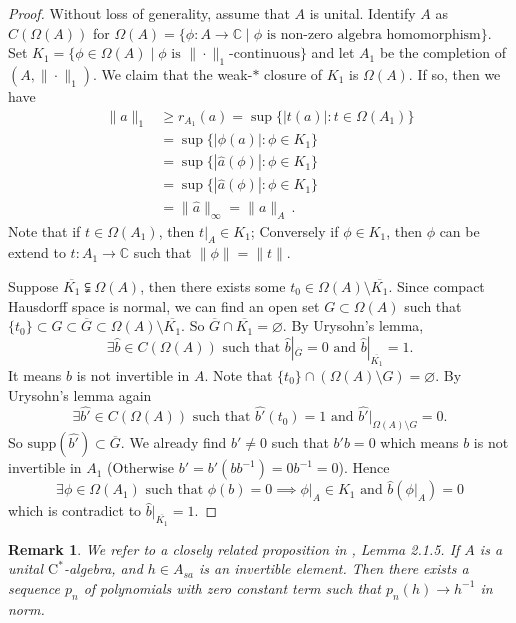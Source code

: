 \documentclass{article}
\newtheorem{remark}{Remark}[section]
\begin{document}
\begin{proof}
Without loss of generality, assume that $A$ is unital. Identify $A$ as $C(\Omega(A))$ for $\Omega(A) = \{ \phi : A \to \mathbb{C} \mid \phi \text{ is non-zero algebra homomorphism}\}$. Set $K_1 = \{ \phi \in \Omega(A) \mid \phi \text{ is } \| \cdot \|_1 \text{-continuous}\}$ and let $A_1$ be the completion of $(A,\| \cdot \|_1)$. We claim that the weak-$*$ closure of $K_1$ is $\Omega(A)$.
If so, then we have
\begin{align*}
\| a \|_1 & \geq r_{A_1}(a) = \sup \{ |t(a)| : t \in \Omega(A_1)\} \\
& = \sup \{ |\phi (a)| : \phi \in K_1 \} \\
& = \sup \{ |\hat{a}(\phi)| : \phi \in K_1\} \\
& = \sup \{ |\hat{a} (\phi)| : \phi \in K_1\} \\
& = \| \hat{a} \|_{\infty} = \| a\|_A \,.
\end{align*}
Note that if $t \in \Omega(A_1)$, then $t|_A \in K_1$; Conversely if $\phi \in K_1$, then $\phi$ can be extend to $t : A_1 \to \mathbb{C}$ such that $\|\phi\| = \| t\|$.

Suppose $\overline{K_1} \subsetneqq \Omega(A)$, then there exists some $t_0 \in \Omega(A) \setminus \overline{K_1}$. Since compact Hausdorff space is normal, we can find an open set $G \subset \Omega(A)$ such that $\{ t_0 \} \subset G \subset \overline{G} \subset \Omega(A) \setminus \overline{K_1}$. So $\overline{G} \cap \overline{K_1} = \varnothing$. By Urysohn's lemma,
\[
\exists \hat{b} \in C(\Omega(A)) \text{ such that } \hat{b} |_{\overline{G}} = 0 \text{ and } \hat{b} |_{\overline{K_1}}=1.
\]
It means $b$ is not invertible in $A$. Note that $\{ t_0\} \cap (\Omega(A) \setminus G) = \varnothing$. By Urysohn's lemma again
\[
\exists \hat{b'} \in C(\Omega(A)) \text{ such that } \hat{b'} (t_0) = 1 \text{ and } \hat{b'} |_{\Omega(A) \setminus G}=0.
\]
So $\text{supp}(\hat{b'}) \subset \overline{G}$. We already find $b' \ne 0$ such that $b'b=0$ which means $b$ is not invertible in $A_1$ (Otherwise $b' = b'(bb^{-1}) = 0b^{-1}=0$). Hence
\[
\exists \phi \in \Omega(A_1) \text{ such that } \phi (b) = 0 \implies \phi|_{A} \in K_1 \text{ and } \hat{b} (\phi |_A) = 0
\]
which is contradict to $\hat{b} |_{\overline{K_1}} = 1$.
\end{proof}

\begin{remark}
We refer to a closely related proposition in \cite{li1992introduction}, Lemma 2.1.5. If $A$ is a unital $\mathrm{C}^*$-algebra, and $h \in A_{sa}$ is an invertible element. Then there exists a sequence $p_n$ of polynomials with zero constant term such that $p_n (h) \to h^{-1}$ in norm.
\end{remark}
\end{document}
